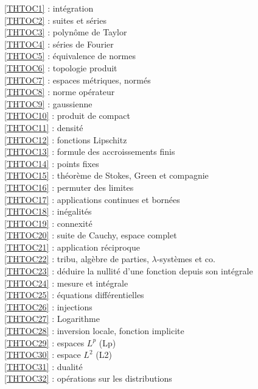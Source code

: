 \ref {THTOC1} : intégration\\
\ref {THTOC2} : suites et séries\\
\ref {THTOC3} : polynôme de Taylor\\
\ref {THTOC4} : séries de Fourier\\
\ref {THTOC5} : équivalence de normes\\
\ref {THTOC6} : topologie produit\\
\ref {THTOC7} : espaces métriques, normés\\
\ref {THTOC8} : norme opérateur\\
\ref {THTOC9} : gaussienne\\
\ref {THTOC10} : produit de compact\\
\ref {THTOC11} : densité\\
\ref {THTOC12} : fonctions Lipschitz\\
\ref {THTOC13} : formule des accroissements finis\\
\ref {THTOC14} : points fixes\\
\ref {THTOC15} : théorème de Stokes, Green et compagnie\\
\ref {THTOC16} : permuter des limites\\
\ref {THTOC17} : applications continues et bornées\\
\ref {THTOC18} : inégalités\\
\ref {THTOC19} : connexité\\
\ref {THTOC20} : suite de Cauchy, espace complet\\
\ref {THTOC21} : application réciproque\\
\ref {THTOC22} : tribu, algèbre de parties, \( \lambda \)-systèmes et co.\\
\ref {THTOC23} : déduire la nullité d'une fonction depuis son intégrale\\
\ref {THTOC24} : mesure et intégrale\\
\ref {THTOC25} : équations différentielles\\
\ref {THTOC26} : injections\\
\ref {THTOC27} : Logarithme\\
\ref {THTOC28} : inversion locale, fonction implicite\\
\ref {THTOC29} : espaces \( L^p\) (Lp)\\
\ref {THTOC30} : espace \( L^2\) (L2)\\
\ref {THTOC31} : dualité\\
\ref {THTOC32} : opérations sur les distributions\\
